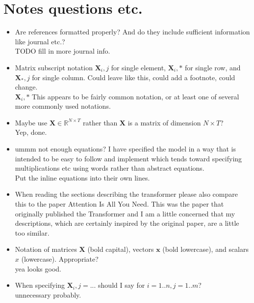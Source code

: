\documentclass[conference]{IEEEtran}
\begin{document}
\section{Notes questions etc.} 
\begin{itemize}
	\item Are references formatted properly? And do they include sufficient information like journal etc.? \\
	TODO fill in more journal info.
	\item Matrix subscript notation $\boldsymbol{X}_i,j$ for single element, $\boldsymbol{X}_i,*$ for single row, and $\boldsymbol{X}_*,j$ for single column. Could leave like this, could add a footnote, could change. \\
	$\boldsymbol{X}_i,*$ This appears to be fairly common notation, or at least one of several more commonly used notations.
	\item Maybe use $\boldsymbol{X} \in \mathbb{R}^{N \times T}$ rather than $\boldsymbol{X}$ is a matrix of dimension $N \times T$? \\
	Yep, done.
	\item ummm not enough equations? I have specified the model in a way that is intended to be easy to follow and implement which tends toward specifying multiplications etc using words rather than abstract equations.\\
	Put the inline equations into their own lines.
	\item When reading the sections describing the transformer please also compare this to the paper Attention Is All You Need. This was the paper that originally published the Transformer and I am a little concerned that my descriptions, which are certainly inspired by the original paper, are a little too similar.
	\item Notation of matrices $\boldsymbol{X}$ (bold capital), vectors $\boldsymbol{x}$ (bold lowercase), and scalars $x$ (lowercase). Appropriate? \\
	yea looks good.
	\item When specifying $\boldsymbol{X}_i,j = ...$ should I say for $i= 1..n, j= 1..m$? \\
	unnecessary probably.
\end{itemize}
\end{document}
